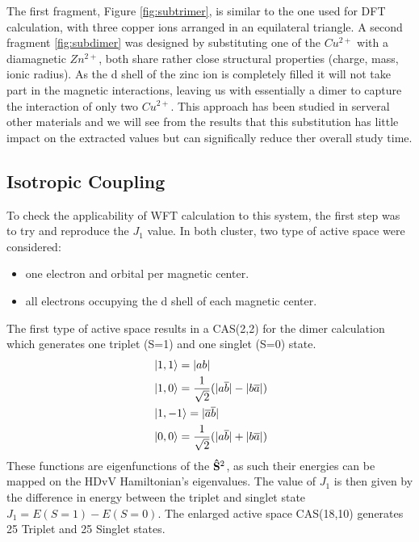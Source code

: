 \documentclass[10pt]{report}
\numberwithin{equation}{section}
\begin{document}
The first fragment, Figure \ref{fig:subtrimer}, is similar to the one used for DFT calculation, with three copper ions arranged in an equilateral triangle. 
A second fragment \ref{fig:subdimer} was designed by substituting one of the $Cu^{2+}$ with a diamagnetic $Zn^{2+}$, both share rather close structural properties (charge, mass, ionic radius).
As the d shell of the zinc ion is completely filled it will not take part in the magnetic interactions, leaving us with essentially a dimer to capture the interaction of only two $Cu^{2+}$. 
This approach has been studied in serveral other materials and we will see from the results that this substitution has little impact on the extracted values but can significally reduce ther overall study time.

\subsection{Isotropic Coupling}

To check the applicability of WFT calculation to this system, the first step was to try and reproduce the $J_1$ value.
In both cluster, two type of active space were considered:
\begin{itemize}
    \item one electron and orbital per magnetic center.
    \item all electrons occupying the d shell of each magnetic center.
\end{itemize}

The first type of active space results in a CAS(2,2) for the dimer calculation which generates one triplet (S=1) and one singlet (S=0) state.
\begin{align}
    &\ket{1,1}=|ab|\\
    &\ket{1,0}=\frac{1}{\sqrt{2}}(|a\overline{b}|-|b\overline{a}|)\\
    &\ket{1,-1}=|\overline{a}\overline{b}|\\
    &\ket{0,0}=\frac{1}{\sqrt{2}}(|a\overline{b}|+|b\overline{a}|)
\end{align}
These functions are eigenfunctions of the $\vb{\hat{S}}^2$, as such their energies can be mapped on the HDvV Hamiltonian's eigenvalues.
The value of $J_1$ is then given by the difference in energy between the triplet and singlet state $J_1=E(S=1)-E(S=0)$.
The enlarged active space CAS(18,10) generates 25 Triplet and 25 Singlet states.
\end{document}
